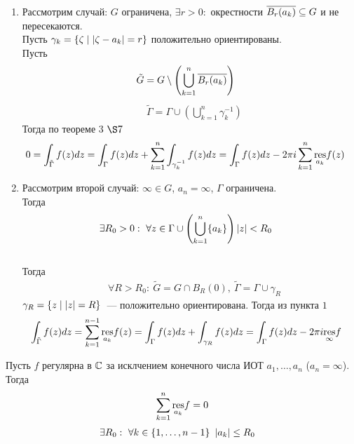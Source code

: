 \begin{enumerate}
    \item Рассмотрим случай: $G$ ограничена, $\exists r > 0:$ окрестности
    $\overline{B_r(a_k)}\subseteq G$ и не пересекаются.
    \\
    Пусть $\gamma_k = \{\zeta \mid \left|{\zeta - a_k}\right| = r\}$ положительно
    ориентированы.
    \\
    Пусть
    \begin{align*}
      & \tilde{G} = G \setminus \left( \bigcup_{k=1}^n\overline{B_r(a_k)} \right)
    \end{align*}
    \begin{align*}
      & \tilde{\Gamma} = \Gamma \cup \left( \bigcup_{k=1}^n  \gamma_k^{-1} \right)
    \end{align*}
    Тогда по теореме $3$ $\S7$
    \begin{align*}
      & 0 = \int_{\tilde{\Gamma}}f(z)dz =  \int_{\Gamma}f(z)dz + \sum_{k=1}^n\int_{\gamma_k^{-1}}f(z)dz =  \int_{\Gamma}f(z)dz -2 \pi i \sum_{k=1}^n\underset{a_k}{\mathrm{res}}f(z)
    \end{align*}
    \item Рассмотрим второй случай: $\infty \in G$, $a_n = \infty$, $\Gamma$
    ограничена.
    \\
    Тогда
    \begin{align*}
      & \exists R_0 > 0: \ \forall z \in \Gamma \cup \left( \bigcup_{k=1}^n\{a_k\} \right) \left|{z}\right| < R_0
    \end{align*}
    \\
    Тогда 
    \begin{align*}
      & \forall R > R_0: \ \tilde{G} = G \cap B_R(0), \ \tilde{\Gamma} = \Gamma \cup \gamma_R
    \end{align*}
    $\gamma_R = \{z \mid \left|{z}\right| = R\}$~--- положительно ориентирована.
    Тогда из пункта $1$
    \begin{align*}
      & \int_{\tilde{\Gamma}}f(z)dz =  \sum_{k=1}^{n-1}\underset{a_k}{\mathrm{res}}f(z) =  \int_{\Gamma}f(z)dz +  \int_{\gamma_R}f(z)dz =  \int_{\Gamma}f(z)dz - 2 \pi i \underset{\infty}{\mathrm{res}} f
    \end{align*}
\end{enumerate}
\corollary
Пусть $f$ регулярна в $\mathbb{C}$ за исклчением конечного числа ИОТ $a_1, \dots, a_n$
($a_n = \infty$). Тогда
\begin{equation}\label{(13.8)}
    \sum_{k=1}^n\underset{a_k}{\mathrm{res}}f = 0
\end{equation}
\pr
\begin{align*}
  & \exists R_0: \ \forall k \in \{1, \dots, n-1\} \ \left|{a_k}\right| \leq R_0
\end{align*}

